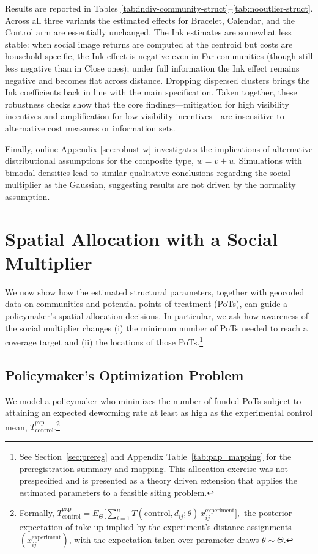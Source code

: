 \documentclass[12pt,a4paper]{article}
\begin{document}
Results are reported in Tables \ref{tab:indiv-community-struct}–\ref{tab:nooutlier-struct}.  Across all three variants the estimated effects for Bracelet, Calendar, and the Control arm are essentially unchanged.  The Ink estimates are somewhat less stable: when social image returns are computed at the centroid but costs are household specific, the Ink effect is negative even in Far communities (though still less negative than in Close ones); under full information the Ink effect remains negative and becomes flat across distance.  Dropping dispersed clusters brings the Ink coefficients back in line with the main specification. Taken together, these robustness checks show that the core findings—mitigation for high visibility incentives and amplification for low visibility incentives—are insensitive to alternative cost measures or information sets.

Finally, online Appendix \ref{sec:robust-w} investigates the implications of alternative distributional assumptions for the composite type, $w = v+u$. Simulations with bimodal densities lead to similar qualitative conclusions regarding the social multiplier as the Gaussian, suggesting results are not driven by the normality assumption.


\section{Spatial Allocation with a Social Multiplier}\label{allocation}

We now show how the estimated structural parameters, together with geocoded data on communities and potential points of treatment (PoTs), can guide a policymaker’s spatial allocation decisions.  In particular, we ask how awareness of the social multiplier changes (i) the minimum number of PoTs needed to reach a coverage target and (ii) the locations of those PoTs.\footnote{See Section~\ref{sec:prereg} and Appendix Table~\ref{tab:pap_mapping} for the preregistration summary and mapping. This allocation exercise was not prespecified and is presented as a theory driven extension that applies the estimated parameters to a feasible siting problem.}

\subsection{Policymaker’s Optimization Problem}

We model a policymaker who minimizes the number of funded PoTs subject to attaining an expected deworming rate at least as high as the experimental control mean, \(\overline T^{\text{exp}}_{\text{control}}\).\footnote{Formally,
\(\overline T^{\text{exp}}_{\text{control}}
   = E_{\Theta}\!\bigl[\sum_{i=1}^{n}
      T(\text{control},d_{ij};\theta)\,
      x_{ij}^{\text{experiment}}\bigr],\)
the posterior expectation of take‑up implied by the experiment’s distance assignments \((x_{ij}^{\text{experiment}})\), with the expectation taken over parameter draws \(\theta\sim\Theta\).}
\end{document}
